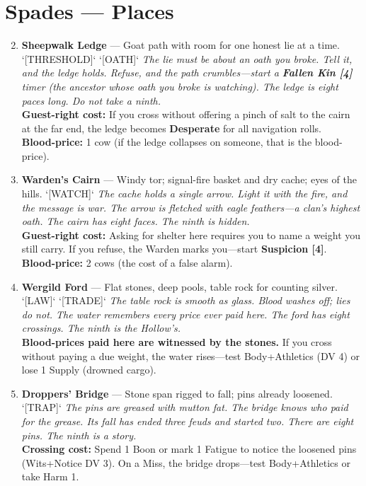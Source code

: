 \section{Spades --- Places}
\label{sec:ubral-places}
\begin{enumerate}
\setcounter{enumi}{1}
\item \textbf{Sheepwalk Ledge} --- Goat path with room for one honest lie at a time. `[THRESHOLD]` `[OATH]`
  \hfill \textit{The lie must be about an oath you broke. Tell it, and the ledge holds. Refuse, and the path crumbles---start a \textbf{Fallen Kin [4]} timer (the ancestor whose oath you broke is watching). The ledge is eight paces long. Do not take a ninth.} \\
  \textbf{Guest-right cost:} If you cross without offering a pinch of salt to the cairn at the far end, the ledge becomes \textbf{Desperate} for all navigation rolls. \\
  \textbf{Blood-price:} 1 cow (if the ledge collapses on someone, that is the blood-price).

\item \textbf{Warden's Cairn} --- Windy tor; signal-fire basket and dry cache; eyes of the hills. `[WATCH]`
  \hfill \textit{The cache holds a single arrow. Light it with the fire, and the message is war. The arrow is fletched with eagle feathers---a clan's highest oath. The cairn has eight faces. The ninth is hidden.} \\
  \textbf{Guest-right cost:} Asking for shelter here requires you to name a weight you still carry. If you refuse, the Warden marks you---start \textbf{Suspicion [4]}. \\
  \textbf{Blood-price:} 2 cows (the cost of a false alarm).

\item \textbf{Wergild Ford} --- Flat stones, deep pools, table rock for counting silver. `[LAW]` `[TRADE]`
  \hfill \textit{The table rock is smooth as glass. Blood washes off; lies do not. The water remembers every price ever paid here. The ford has eight crossings. The ninth is the Hollow's.} \\
  \textbf{Blood-prices paid here are witnessed by the stones.} If you cross without paying a due weight, the water rises---test Body+Athletics (DV 4) or lose 1 Supply (drowned cargo).

\item \textbf{Droppers' Bridge} --- Stone span rigged to fall; pins already loosened. `[TRAP]`
  \hfill \textit{The pins are greased with mutton fat. The bridge knows who paid for the grease. Its fall has ended three feuds and started two. There are eight pins. The ninth is a story.} \\
  \textbf{Crossing cost:} Spend 1 Boon or mark 1 Fatigue to notice the loosened pins (Wits+Notice DV 3). On a Miss, the bridge drops---test Body+Athletics or take Harm 1.


\end{enumerate}
